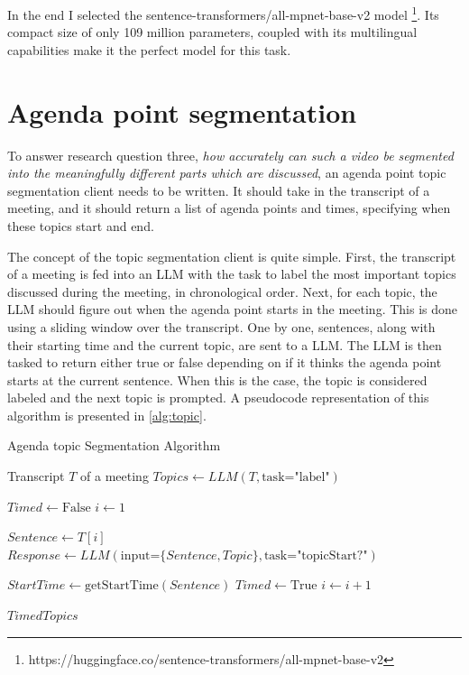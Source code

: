 \documentclass[twoside]{uva-inf-bachelor-thesis}
\begin{document}
In the end I selected the sentence-transformers/all-mpnet-base-v2 model \footnote{https://huggingface.co/sentence-transformers/all-mpnet-base-v2}. Its compact size of only 109 million parameters, coupled with its multilingual capabilities make it the perfect model for this task.

\section{Agenda point segmentation}\label{sec:agendapoints}
To answer research question three, \textit{how accurately can such a video be segmented into the meaningfully different parts which are discussed}, an agenda point topic segmentation client needs to be written. It should take in the transcript of a meeting, and it should return a list of agenda points and times, specifying when these topics start and end.


The concept of the topic segmentation client is quite simple. First, the transcript of a meeting is fed into an LLM with the task to label the most important topics discussed during the meeting, in chronological order. 
Next, for each topic, the LLM should figure out when the agenda point starts in the meeting. This is done using a sliding window over the transcript. 
One by one, sentences, along with their starting time and the current topic, are sent to a LLM. The LLM is then tasked to return either true or false depending on if it thinks the agenda point starts at the current sentence. When this is the case, the topic is considered labeled and the next topic is prompted. 
A pseudocode representation of this algorithm is presented in \ref{alg:topic}.

\begin{algorithm}
\caption{Agenda topic Segmentation Algorithm}
\label{alg:topic}
\begin{algorithmic}
    \Require Transcript $T$ of a meeting
    \State $Topics \gets LLM(T, \text{task="label"})$
    
        \State $Timed \gets \text{False}$
        \State $i \gets 1$
        
            \State $Sentence \gets T[i]$
            \State $Response \gets LLM(\text{input=}\{Sentence, Topic\}, \text{task="topicStart?"})$
            
                \State $StartTime \gets \text{getStartTime}(Sentence)$
                \State $Timed \gets \text{True}$
            \Else
                \State $i \gets i + 1$
            \EndIf
        \EndWhile
    \EndFor
    
    \State \Return $TimedTopics$
\end{algorithmic}
\end{algorithm}
\end{document}

